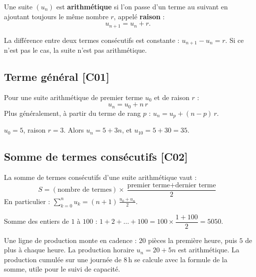 \documentclass[a4paper,11pt]{article}
\begin{document}
\begin{definition}
Une suite $(u_n)$ est \textbf{arithmétique} si l'on passe d'un terme au suivant en ajoutant toujours le même nombre $r$, appelé \textbf{raison} :
\[
u_{n+1} = u_n + r.
\]
\end{definition}

\begin{methode}
La différence entre deux termes consécutifs est constante : $u_{n+1} - u_n = r$. Si ce n'est pas le cas, la suite n'est pas arithmétique.
\end{methode}

\subsection{Terme général \hfill {\normalsize\color{uimmred}[C01]}}

\begin{theoreme}
Pour une suite arithmétique de premier terme $u_0$ et de raison $r$ :
\[
\boxed{u_n = u_0 + n\,r}
\]
Plus généralement, à partir du terme de rang $p$ : $u_n = u_p + (n - p)\,r$.
\end{theoreme}

\begin{exemple}
$u_0 = 5$, raison $r = 3$. Alors $u_n = 5 + 3n$, et $u_{10} = 5 + 30 = 35$.
\end{exemple}

\subsection{Somme de termes consécutifs \hfill {\normalsize\color{uimmred}[C02]}}

\begin{theoreme}
La somme de termes consécutifs d'une suite arithmétique vaut :
\[
\boxed{S = (\text{nombre de termes}) \times \frac{\text{premier terme} + \text{dernier terme}}{2}}
\]
En particulier : $\displaystyle \sum_{k=0}^{n} u_k = (n+1)\,\frac{u_0 + u_n}{2}$.
\end{theoreme}

\begin{exemple}
Somme des entiers de $1$ à $100$ : $1 + 2 + \dots + 100 = 100 \times \dfrac{1 + 100}{2} = 5050$.
\end{exemple}

\begin{appliindus}
Une ligne de production monte en cadence : $20$ pièces la première heure, puis $5$ de plus à chaque heure. La production horaire $u_n = 20 + 5n$ est arithmétique. La production cumulée sur une journée de $8$\,h se calcule avec la formule de la somme, utile pour le suivi de capacité.
\end{appliindus}
\end{document}
